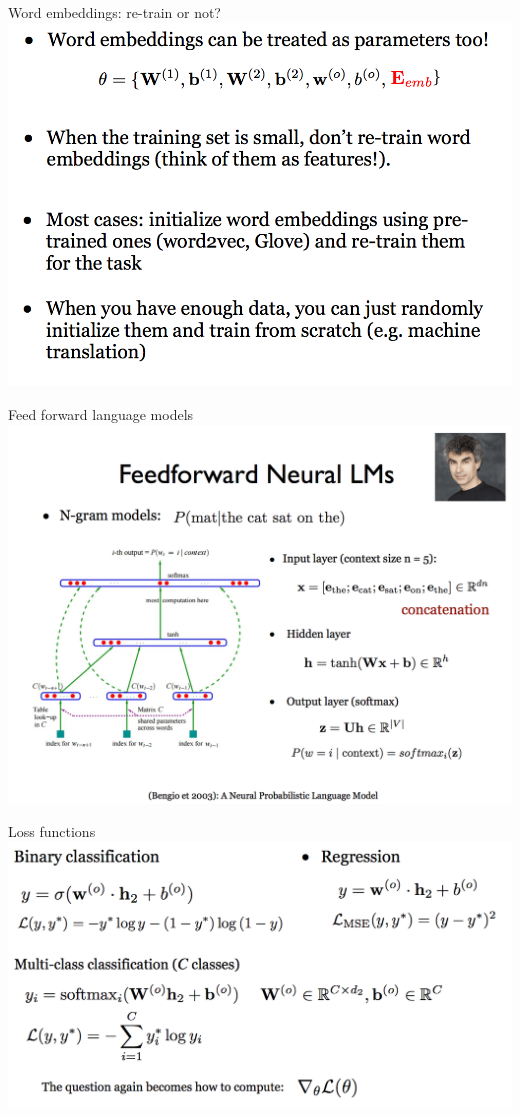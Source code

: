 \begin{frame}{Word embeddings: re-train or not?}
\centering
\includegraphics[scale=0.30]{figures/ff/wordembedding.png}
\end{frame}

\begin{frame}{Feed forward language models}
\centering
\includegraphics[scale=0.23]{figures/ff/ngramfflm2.png}
\end{frame}

\begin{frame}{Loss functions}
\centering
\includegraphics[scale=0.23]{figures/ff/losses.png}
\end{frame}

